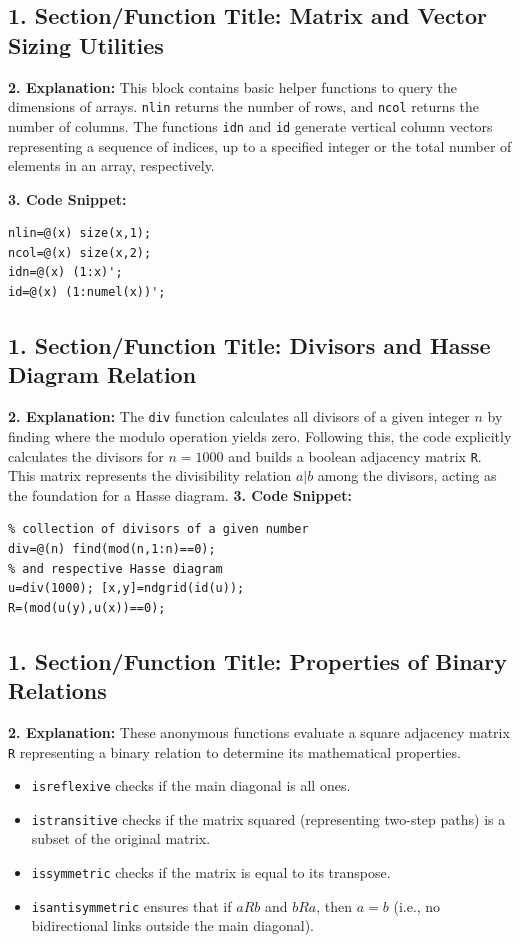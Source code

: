 \subsection{1. Section/Function Title: Matrix and Vector Sizing Utilities}
\textbf{2. Explanation:} This block contains basic helper functions to query the dimensions of arrays. \texttt{nlin} returns the number of rows, and \texttt{ncol} returns the number of columns. The functions \texttt{idn} and \texttt{id} generate vertical column vectors representing a sequence of indices, up to a specified integer or the total number of elements in an array, respectively.

\textbf{3. Code Snippet:}
\begin{lstlisting}
nlin=@(x) size(x,1);
ncol=@(x) size(x,2);
idn=@(x) (1:x)';
id=@(x) (1:numel(x))';
\end{lstlisting}

\subsection{1. Section/Function Title: Divisors and Hasse Diagram Relation}
\textbf{2. Explanation:} The \texttt{div} function calculates all divisors of a given integer $n$ by finding where the modulo operation yields zero. Following this, the code explicitly calculates the divisors for $n=1000$ and builds a boolean adjacency matrix \texttt{R}. This matrix represents the divisibility relation $a|b$ among the divisors, acting as the foundation for a Hasse diagram. 
\textbf{3. Code Snippet:}
\begin{lstlisting}
% collection of divisors of a given number
div=@(n) find(mod(n,1:n)==0);
% and respective Hasse diagram
u=div(1000); [x,y]=ndgrid(id(u));
R=(mod(u(y),u(x))==0); 
\end{lstlisting}

\subsection{1. Section/Function Title: Properties of Binary Relations}
\textbf{2. Explanation:} These anonymous functions evaluate a square adjacency matrix \texttt{R} representing a binary relation to determine its mathematical properties. 
\begin{itemize}
    \item \texttt{isreflexive} checks if the main diagonal is all ones.
    \item \texttt{istransitive} checks if the matrix squared (representing two-step paths) is a subset of the original matrix.
    \item \texttt{issymmetric} checks if the matrix is equal to its transpose.
    \item \texttt{isantisymmetric} ensures that if $aRb$ and $bRa$, then $a=b$ (i.e., no bidirectional links outside the main diagonal).
\end{itemize}

